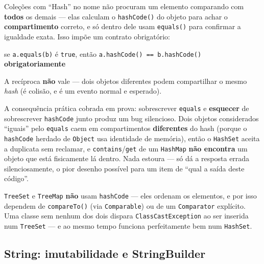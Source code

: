 \begin{conceito}
Coleções com “Hash” no nome não procuram um elemento comparando com
\textbf{todos} os demais --- elas calculam o \texttt{hashCode()} do
objeto para achar o \textbf{compartimento} correto, e só dentro dele usam
\texttt{equals()} para confirmar a igualdade exata. Isso impõe um
contrato obrigatório:

\begin{center}
se \texttt{a.equals(b)} é \texttt{true}, então \texttt{a.hashCode() ==
b.hashCode()} \textbf{obrigatoriamente}
\end{center}

A recíproca \textbf{não} vale --- dois objetos diferentes podem
compartilhar o mesmo \textit{hash} (é colisão, e é um evento normal e
esperado).

A consequência prática cobrada em prova: sobrescrever \texttt{equals} e
\textbf{esquecer} de sobrescrever \texttt{hashCode} junto produz um bug
silencioso. Dois objetos considerados “iguais” pelo \texttt{equals} caem
em compartimentos \textbf{diferentes} do hash (porque o \texttt{hashCode}
herdado de \texttt{Object} usa identidade de memória), então o
\texttt{HashSet} aceita a duplicata sem reclamar, e
\texttt{contains}/\texttt{get} de um \texttt{HashMap} \textbf{não
encontra} um objeto que está fisicamente lá dentro. Nada estoura --- só dá
a resposta errada silenciosamente, o pior desenho possível para um item de
“qual a saída deste código”.

\texttt{TreeSet} e \texttt{TreeMap} \textbf{não} usam \texttt{hashCode}
--- eles ordenam os elementos, e por isso dependem de
\texttt{compareTo()} (via \texttt{Comparable}) ou de um
\texttt{Comparator} explícito. Uma classe sem nenhum dos dois dispara
\texttt{ClassCastException} ao ser inserida num \texttt{TreeSet} --- e ao
mesmo tempo funciona perfeitamente bem num \texttt{HashSet}.
\end{conceito}

\subsection{String: imutabilidade e StringBuilder}

